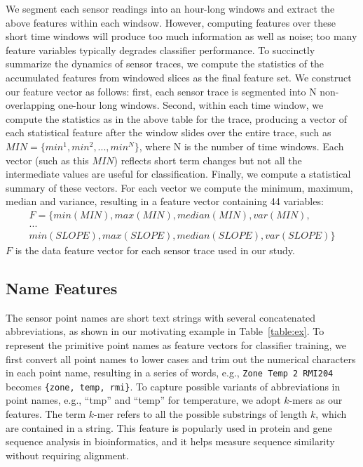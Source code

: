 We segment each sensor readings into an hour-long windows and extract the above features within each windsow. 
However, computing features over these short time windows will produce too much information as well as noise; too many feature variables typically degrades classifier performance.
To succinctly summarize the dynamics of sensor traces, we compute the statistics of the accumulated features from windowed slices as the final feature set. 
We construct our feature vector as follows: first, each sensor trace is segmented into N non-overlapping one-hour long windows. Second, within each time window, we compute the statistics as in the above table for the trace, producing a vector of each statistical feature after the window slides over the entire trace, such as 
$MIN = \{min^{1}, min^{2}, ..., min^{N}\}$, where N is the number of time windows. Each vector (such as this $MIN$) reflects short term changes but not all the intermediate values are useful for classification. 
Finally, we compute a statistical summary of these vectors. For each vector we compute the minimum, maximum, median and variance, resulting in a feature vector containing 44 variables:
\begin{displaymath}
\begin{split}
F = \{min(MIN), max(MIN), median(MIN), var(MIN),\\
...\\
min(SLOPE), max(SLOPE), median(SLOPE), var(SLOPE)\}
\end{split}
\end{displaymath}
$F$ is the data feature vector for each sensor trace used in our study.


\subsection{Name Features}
The sensor point names are short text strings with several concatenated abbreviations, as shown in our motivating example in Table~\ref{table:ex}. 
To represent the primitive point names as feature vectors for classifier training, we first convert all point names to lower cases and trim out the numerical characters in each point name, resulting in a series of words, e.g., \texttt{Zone Temp 2 RMI204} becomes \texttt{\{zone, temp, rmi\}}. 
To capture possible variants of abbreviations in point names, e.g., ``tmp'' and ``temp'' for temperature, we adopt $k$-mers \cite{leslie2004mismatch} as our features. 
The term $k$-mer refers to all the possible substrings of length $k$, which are contained in a string. This feature is popularly used in protein and gene sequence analysis in bioinformatics, and it helps measure sequence similarity without requiring alignment. 

